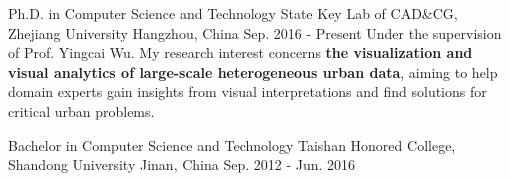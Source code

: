 

\begin{cventries}

  \cventry
    {Ph.D. in Computer Science and Technology} %
    {State Key Lab of CAD\&CG, Zhejiang University} %
    {Hangzhou, China} %
    {Sep. 2016 - Present} %
    {{Under the supervision of Prof. Yingcai Wu. My research interest concerns \textbf{the visualization and visual analytics of large-scale heterogeneous urban data}, aiming to help domain experts gain insights from visual interpretations and find solutions for critical urban problems.}}
  \vspace{1mm}

  \cventry
    {Bachelor in Computer Science and Technology}
    {Taishan Honored College, Shandong University}
    {Jinan, China}
    {Sep. 2012 - Jun. 2016}
    {}

\end{cventries}
\vspace{-5mm}
